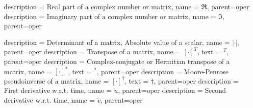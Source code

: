 {
	description = {Real part of a complex number or matrix}, 
	name = {\ensuremath{\Re}},
	parent=oper
}
{
	description = {Imaginary part of a complex number or matrix}, 
	name = {\ensuremath{\Im}},
	parent=oper
}

{
	description = {Determinant of a matrix, Absolute value of a scalar}, 
	name = {\ensuremath{\vert\cdot\vert}},
	parent=oper
}
{
	description = {Transpose of a matrix}, 
	name = {\ensuremath{\left[\cdot\right]^T}},
	text = {\ensuremath{^T}},
	parent=oper
}
{
	description = {Complex-conjugate or Hermitian transpose of a matrix}, 
	name = {\ensuremath{\left[\cdot\right]^*}},
	text = {\ensuremath{^*}},
	parent=oper
}
{
	description = {Moore-Penrose pseudoinverse of a matrix}, 
	name = {\ensuremath{\left[\cdot\right]^\dagger}},
	text = {\ensuremath{\dagger}},	
	parent=oper
}
{
	description = {First derivative w.r.t. time}, 
	name = {\ensuremath{\dot{u}}},
	parent=oper
}
{
	description = {Second derivative w.r.t. time}, 
	name = {\ensuremath{\ddot{v}}},
	parent=oper
}

